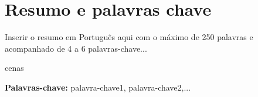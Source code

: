 
\chapter*{Resumo e palavras chave}


Inserir o resumo em Portugu\^{e}s aqui com o máximo de 250 palavras e acompanhado de 4 a 6 palavras-chave...

cenas

\vfill

\textbf{Palavras-chave:} palavra-chave1, palavra-chave2,...

\cleardoublepage

